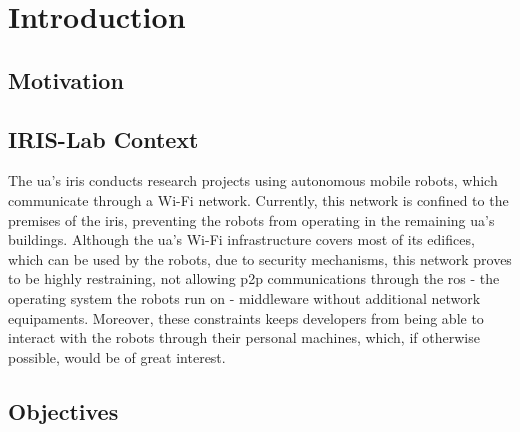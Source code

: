 

\chapter{Introduction}
\label{chapter:introduction}


\section{Motivation}


\section{IRIS-Lab Context}

The \ac{ua}'s \ac{iris} conducts research projects using autonomous mobile robots, which communicate through a Wi-Fi network. Currently, this network is confined to the premises of the \ac{iris}, preventing the robots from operating in the remaining \ac{ua}'s buildings. Although the \ac{ua}'s Wi-Fi infrastructure covers most of its edifices, which can be used by the robots, due to security mechanisms, this network proves to be highly restraining, not allowing \ac{p2p} communications through the \ac{ros} - the operating system the robots run on - middleware without additional network equipaments. Moreover, these constraints keeps developers from being able to interact with the robots through their personal machines, which, if otherwise possible, would be of great interest.

\section{Objectives}

